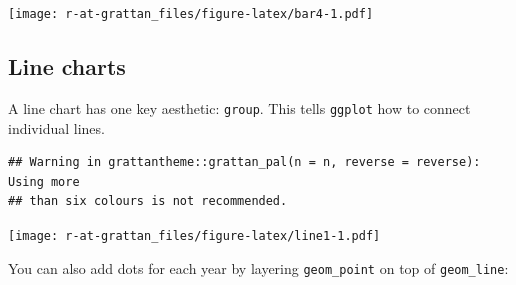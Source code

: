 \documentclass[]{book}
\newenvironment{Shaded}{\begin{snugshade}}{\end{snugshade}}
\newcommand{\DataTypeTok}[1]{\textcolor[rgb]{0.13,0.29,0.53}{#1}}
\newcommand{\DecValTok}[1]{\textcolor[rgb]{0.00,0.00,0.81}{#1}}
\newcommand{\KeywordTok}[1]{\textcolor[rgb]{0.13,0.29,0.53}{\textbf{#1}}}
\newcommand{\NormalTok}[1]{#1}
\newcommand{\OperatorTok}[1]{\textcolor[rgb]{0.81,0.36,0.00}{\textbf{#1}}}
\newcommand{\StringTok}[1]{\textcolor[rgb]{0.31,0.60,0.02}{#1}}
\begin{document}
\texttt{[image: r-at-grattan\_files/figure-latex/bar4-1.pdf]}

\hypertarget{line-charts}{%
\subsection{Line charts}\label{line-charts}}

A line chart has one key aesthetic: \texttt{group}. This tells \texttt{ggplot} how to connect individual lines.

\begin{Shaded}
\end{Shaded}

\begin{verbatim}
## Warning in grattantheme::grattan_pal(n = n, reverse = reverse): Using more
## than six colours is not recommended.
\end{verbatim}

\texttt{[image: r-at-grattan\_files/figure-latex/line1-1.pdf]}

You can also add dots for each year by layering \texttt{geom\_point} on top of \texttt{geom\_line}:
\end{document}
